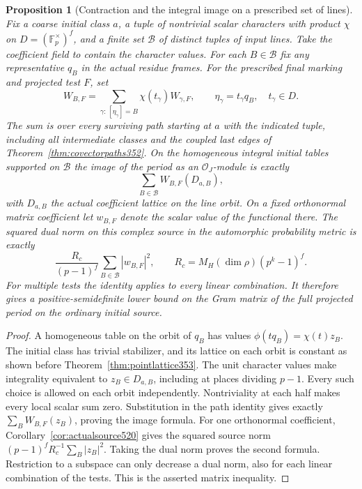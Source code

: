\documentclass[a4paper,11pt]{article}
\newtheorem{proposition}{Proposition}[section]
\theoremstyle{definition}
\theoremstyle{remark}
\numberwithin{equation}{section}
\begin{document}
\begin{proposition}[Contraction and the integral image on a prescribed set of lines]
\leavevmode\label{prop:lineimage522}
Fix a coarse initial class \(a\), a tuple of nontrivial scalar
characters with product \(\chi\) on \(D=(\mathbb F_p^\times)^f\),
and a finite set \(\mathcal B\) of distinct tuples of input lines.
Take the coefficient field to contain the character values. For each
\(B\in\mathcal B\) fix any representative \(q_B\) in the actual
residue frames. For the prescribed final marking and projected test
\(F\), set
\[
 W_{B,F}=\sum_{\gamma:\,[\eta_\gamma]=B}
              \chi(t_\gamma) W_{\gamma,F},\qquad
             \eta_\gamma=t_\gamma q_B,\quad t_\gamma\in D.
\]
The sum is over every surviving path starting at \(a\) with the
indicated tuple, including all intermediate classes and the coupled
last edges of Theorem~\ref{thm:covectorpaths352}.
On the homogeneous integral initial tables supported on \(\mathcal B\)
the image of the period as an \(\mathcal O_J\)-module is exactly
\[
                    \sum_{B\in\mathcal B} W_{B,F}(D_{a,B}),
\]
with \(D_{a,B}\) the actual coefficient lattice on the line orbit.
On a fixed orthonormal matrix coefficient let \(w_{B,F}\) denote the
scalar value of the functional there. The squared dual norm on this
complex source in the automorphic probability metric is exactly
\[
     \frac{R_c}{(p-1)^f}\sum_{B\in\mathcal B}|w_{B,F}|^2,
     \qquad R_c=M_H(\dim\rho)(p^k-1)^f .
\]
For multiple tests the identity applies to every linear combination.
It therefore gives a positive-semidefinite lower bound on the Gram
matrix of the full projected period on the ordinary initial source.
\end{proposition}
\begin{proof}
A homogeneous table on the orbit of \(q_B\) has values
\(\phi(t q_B)=\chi(t)z_B\). The initial class has trivial stabilizer,
and its lattice on each orbit is constant as shown before
Theorem~\ref{thm:pointlattice353}. The unit character values make
integrality equivalent to \(z_B\in D_{a,B}\), including at places
dividing \(p-1\). Every such choice is allowed on each orbit
independently. Nontriviality at each half makes every local scalar
sum zero. Substitution in the path identity gives exactly
\(\sum_B W_{B,F}(z_B)\), proving the image formula. For one
orthonormal coefficient, Corollary~\ref{cor:actualsource520} gives the
squared source norm \((p-1)^f R_c^{-1}\sum_B|z_B|^2\).
Taking the dual norm proves the second formula. Restriction to a
subspace can only decrease a dual norm, also for each linear
combination of the tests. This is the asserted matrix inequality.
\end{proof}
\end{document}

